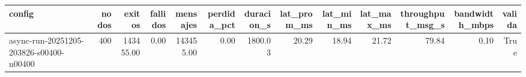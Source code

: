\begin{tabular}{lrrrrrrrrrrrr}
\toprule
config & nodos & exitos & fallidos & mensajes & perdida_pct & duracion_s & lat_prom_ms & lat_min_ms & lat_max_ms & throughput_msg_s & bandwidth_mbps & valida \\
\midrule
async-run-20251205-203826-s00400-n00400 & 400 & 143455.00 & 0.00 & 143455.00 & 0.00 & 1800.03 & 20.29 & 18.94 & 21.72 & 79.84 & 0.10 & True \\
\bottomrule
\end{tabular}
